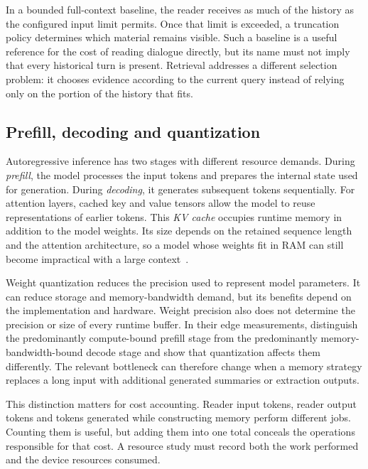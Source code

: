 In a bounded full-context baseline, the reader receives as much of the history as the
configured input limit permits. Once that limit is exceeded, a truncation policy determines
which material remains visible. Such a baseline is a useful reference for the cost of
reading dialogue directly, but its name must not imply that every historical turn is
present. Retrieval addresses a different selection problem: it chooses evidence according
to the current query instead of relying only on the portion of the history that fits.

\subsection{Prefill, decoding and quantization}

Autoregressive inference has two stages with different resource demands. During
\emph{prefill}, the model processes the input tokens and prepares the internal state used
for generation. During \emph{decoding}, it generates subsequent tokens sequentially. For
attention layers, cached key and value tensors allow the model to reuse representations of
earlier tokens. This \emph{KV cache} occupies runtime memory in addition to the model
weights. Its size depends on the retained sequence length and the attention architecture,
so a model whose weights fit in RAM can still become impractical with a large
context~\citep{ondevice_lm_review,slm_edge_deployment}.

Weight quantization reduces the precision used to represent model parameters. It can
reduce storage and memory-bandwidth demand, but its benefits depend on the implementation and
hardware. Weight precision also does not determine the precision or size of every runtime
buffer. In their edge measurements, \citet{slm_edge_deployment} distinguish the predominantly
compute-bound prefill stage from the predominantly memory-bandwidth-bound decode stage and
show that quantization affects them differently. The relevant bottleneck can therefore
change when a memory strategy replaces a long input with additional generated summaries
or extraction outputs.

This distinction matters for cost accounting. Reader input tokens, reader output tokens
and tokens generated while constructing memory perform different jobs. Counting them is
useful, but adding them into one total conceals the operations responsible for that cost.
A resource study must record both the work performed and the device resources consumed.

